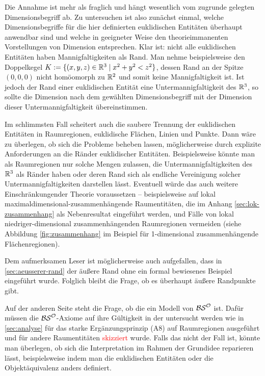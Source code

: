     Die
    Annahme ist mehr als fraglich und hängt wesentlich vom zugrunde gelegten Dimensionsbegriff ab.
    Zu untersuchen ist also zunächst einmal, welche Dimensionsbegriffe für die hier definierten euklidischen Entitäten überhaupt anwendbar sind und welche in geeigneter Weise den theorieimmanenten Vorstellungen von Dimension entsprechen.
    Klar ist: nicht alle euklidischen Entitäten haben Mannigfaltigkeiten als Rand.
    Man nehme beispielsweise den Doppelkegel $K := \{(x,y,z) \in \mathbb{R}^3 \mid x^2+y^2 < z^2\}$, dessen Rand an der Spitze $(0,0,0)$ nicht homöomorph zu $\mathbb{R}^2$ und somit keine Mannigfaltigkeit ist.
    Ist jedoch der Rand einer euklidischen Entität eine Untermannigfaltigkeit des $\mathbb{R}^3$, so sollte die Dimension nach dem gewählten Dimensionsbegriff mit der Dimension dieser Untermannigfaltigkeit übereinstimmen.
    
    Im
    schlimmsten Fall scheitert auch die saubere Trennung der euklidischen Entitäten in Raumregionen, euklidische Flächen, Linien und Punkte.
    Dann wäre zu überlegen, ob sich die Probleme beheben lassen, möglicherweise durch explizite Anforderungen an die Ränder euklidischer Entitäten. 
    Beispielsweise könnte man als Raumregionen nur solche Mengen zulassen, die Untermannigfaltigkeiten des $\mathbb{R}^3$ als Ränder haben oder deren Rand sich als endliche Vereinigung solcher Untermannigfaltigkeiten darstellen lässt.
    Eventuell würde das auch weitere Einschränkungender Theorie voraussetzen -- beispielsweise auf lokal maximaldimensional-zusammenhängende Raumentitäten, die im Anhang \ref{sec:lok-zusammenhang} als Nebenresultat eingeführt werden, und Fälle von lokal niedriger-dimensional zusammenhängenden Raumregionen vermeiden (siehe Abbildung \ref{fig:zusammenhang} im Beispiel für 1-dimensional zusammenhängende Flächenregionen).
    
    Dem
    aufmerksamen Leser ist möglicherweise auch aufgefallen, dass in \ref{sec:aeusserer-rand} der äußere Rand ohne ein formal bewiesenes Beispiel eingeführt wurde.
    Folglich bleibt die Frage, ob es überhaupt äußere Randpunkte gibt.
    
    Auf
    der anderen Seite steht die Frage, ob die \strukt ein Modell von $\mathcal{BS}^{\mathcal{O}}$ ist. Dafür müssen die $\mathcal{BS}^{\mathcal{O}}$-Axiome auf ihre Gültigkeit in der \strukt untersucht werden wie in \ref{sec:analyse} für das starke Ergänzungsprinzip (A8) auf Raumregionen ausgeführt und für andere Raumentitäten \textcolor{red}{skizziert} wurde.
    Falls das nicht der Fall ist, könnte man überlegen, ob sich die Interpretation im Rahmen der Grundidee reparieren lässt, beispielsweise indem man die euklidischen Entitäten oder die Objektäquivalenz anders definiert.
    
